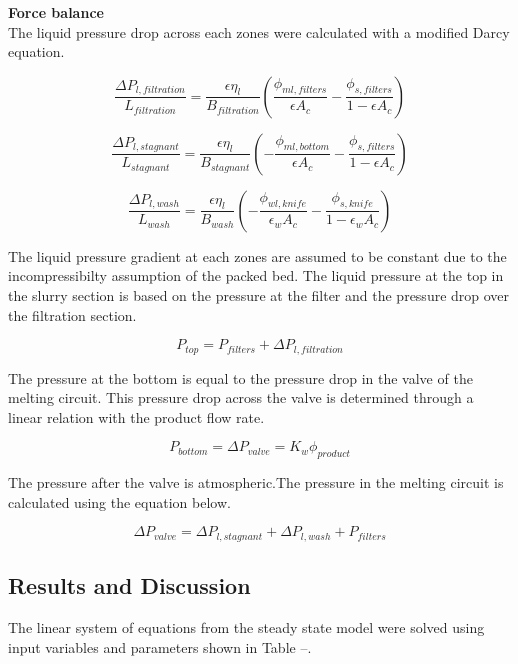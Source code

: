 \textbf{Force balance}
\\The liquid pressure drop across each zones were calculated with a modified Darcy equation. 

\begin{equation}
\frac{\Delta P_{l,filtration}}{L_{filtration}}=\frac{\epsilon \eta_{l}}{B_{filtration}}\left(\frac{\phi_{ml,filters}}{\epsilon A_c} - \frac{\phi_{s,filters}}{1-\epsilon A_c}\right)
\end{equation}

\begin{equation}
\frac{\Delta P_{l,stagnant}}{L_{stagnant}}=\frac{\epsilon \eta_{l}}{B_{stagnant}}\left(-\frac{\phi_{ml,bottom}}{\epsilon A_c} - \frac{\phi_{s,filters}}{1-\epsilon A_c}\right)
\end{equation}

\begin{equation}
\frac{\Delta P_{l,wash}}{L_{wash}}=\frac{\epsilon \eta_{l}}{B_{wash}}\left(-\frac{\phi_{wl,knife}}{\epsilon_w A_c} - \frac{\phi_{s,knife}}{1-\epsilon_w A_c}\right)
\end{equation}

The liquid pressure gradient at each zones are assumed to be constant due to the incompressibilty assumption of the packed bed. The liquid pressure at the top in the slurry section is based on the pressure at the filter and the pressure drop over the filtration section. 

\begin{equation}
P_{top} = P_{filters} + \Delta P_{l,filtration}
\end{equation}


The pressure at the bottom is equal to the pressure drop in the valve of the melting circuit. This pressure drop across the valve is determined through a linear relation with the product flow rate. 

\begin{equation}
P_{bottom}=\Delta P_{valve} = K_w\phi_{product}
\end{equation}

The pressure after the valve is atmospheric.The pressure in the melting circuit is calculated using the equation below. 

\begin{equation}
\Delta P_{valve} = \Delta P_{l,stagnant} + \Delta P_{l,wash} + P_{filters}
\end{equation}


\subsection{Results and Discussion}
The linear system of equations from the steady state model were solved using input variables and parameters shown in Table --. 


